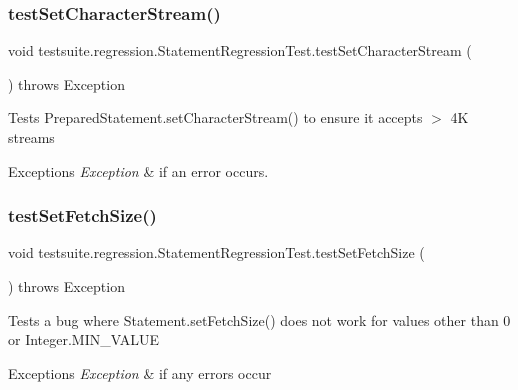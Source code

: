 \subsubsection{\texorpdfstring{test\+Set\+Character\+Stream()}{testSetCharacterStream()}}
{\footnotesize\ttfamily void testsuite.\+regression.\+Statement\+Regression\+Test.\+test\+Set\+Character\+Stream (\begin{DoxyParamCaption}{ }\end{DoxyParamCaption}) throws Exception}

Tests Prepared\+Statement.\+set\+Character\+Stream() to ensure it accepts $>$ 4K streams


\begin{DoxyExceptions}{Exceptions}
{\em Exception} & if an error occurs. \\
\hline
\end{DoxyExceptions}
\mbox{\label{classtestsuite_1_1regression_1_1_statement_regression_test_a94ba62e42c45e2025b030f3a7f69ea17}} 
\subsubsection{\texorpdfstring{test\+Set\+Fetch\+Size()}{testSetFetchSize()}}
{\footnotesize\ttfamily void testsuite.\+regression.\+Statement\+Regression\+Test.\+test\+Set\+Fetch\+Size (\begin{DoxyParamCaption}{ }\end{DoxyParamCaption}) throws Exception}

Tests a bug where Statement.\+set\+Fetch\+Size() does not work for values other than 0 or Integer.\+M\+I\+N\+\_\+\+V\+A\+L\+UE


\begin{DoxyExceptions}{Exceptions}
{\em Exception} & if any errors occur \\
\hline
\end{DoxyExceptions}
\mbox{\label{classtestsuite_1_1regression_1_1_statement_regression_test_a81fe072b5269fee8c61a3391538282c2}} 
